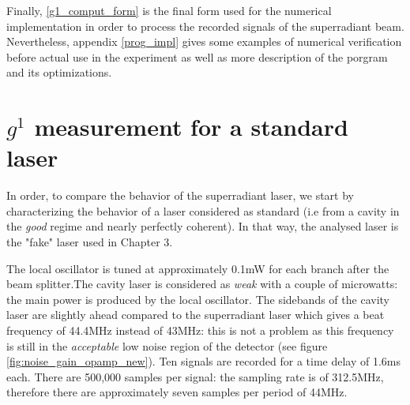 \documentclass[11pt]{report}
\begin{document}
Finally, \eqref{g1_comput_form} is the final form used for the numerical implementation in order to process the recorded signals of the superradiant beam. Nevertheless, appendix \ref{prog_impl} gives some examples of numerical verification before actual use in the experiment as well as more description of the porgram and its optimizations.

\section{$g^1$ measurement for a standard laser}

In order, to compare the behavior of the superradiant laser, we start by characterizing the behavior of a laser considered as standard (i.e from a cavity in the \textit{good} regime and nearly perfectly coherent). In that way, the analysed laser is the "fake" laser used in Chapter 3.

The local oscillator is tuned at approximately 0.1mW for each branch after the beam splitter.The cavity laser is considered as \textit{weak} with a couple of microwatts: the main power is produced by the local oscillator. The sidebands of the cavity laser are slightly ahead compared to the superradiant laser which gives a beat frequency of 44.4MHz instead of 43MHz: this is not a problem as this frequency is still in the \textit{acceptable} low noise region of the detector (see figure \ref{fig:noise_gain_opamp_new}). Ten signals are recorded for a time delay of 1.6ms each. There are 500,000 samples per signal: the sampling rate is of 312.5MHz, therefore there are approximately seven samples per period of 44MHz.
\end{document}
